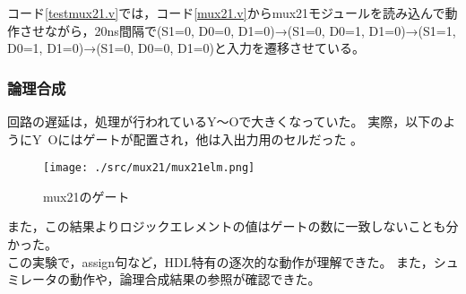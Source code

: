 コード\ref{testmux21.v}では，コード\ref{mux21.v}からmux21モジュールを読み込んで動作させながら，20ns間隔で(S1=0, D0=0, D1=0)→(S1=0, D0=1, D1=0)→(S1=1, D0=1, D1=0)→(S1=0, D0=0, D1=0)と入力を遷移させている。

\subsubsection{論理合成}
回路の遅延は，処理が行われているY～Oで大きくなっていた。
実際，以下のようにY~Oにはゲートが配置され，他は入出力用のセルだった 。

\begin{figure}[H]
  \centering
  \texttt{[image: ./src/mux21/mux21elm.png]}
  \caption{mux21のゲート}
\end{figure}

また，この結果よりロジックエレメントの値はゲートの数に一致しないことも分かった。\\

この実験で，assign句など，HDL特有の逐次的な動作が理解できた。
また，シュミレータの動作や，論理合成結果の参照が確認できた。
